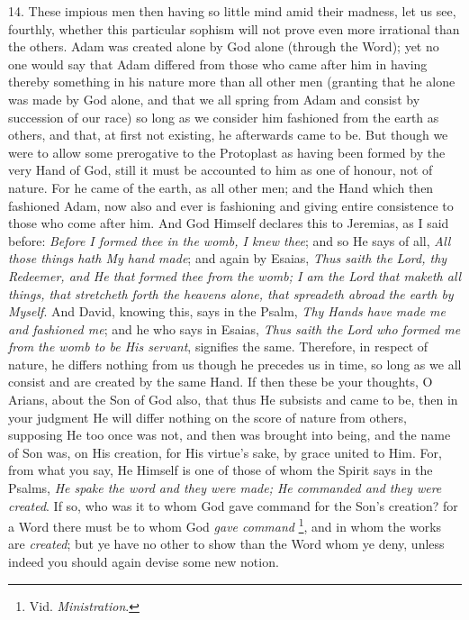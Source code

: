 14. These impious men then
having so little mind amid their madness, let us see, fourthly,
whether this particular sophism will not prove even more irrational
than the others. Adam was created alone by God alone (through the
Word); yet no one would say that Adam differed from those who came
after him in having thereby something in his nature more than all
other men (granting that he alone was made by God alone, and that we
all spring from Adam and consist by succession of our race) so long as
we consider him fashioned from the earth as others, and that, at first
not existing, he afterwards came to be. But though we were to allow
some prerogative to the Protoplast as having been formed by the very
Hand of God, still it must be accounted to him as one of honour, not
of nature. For he came of the earth, as all other men; and the Hand
which then fashioned Adam, now also and ever is fashioning and giving
entire consistence to those who come after him. And God Himself
declares this to Jeremias, as I said before: \emph{Before I formed thee
in the womb, I knew thee}; and so He says of all, \emph{All those
things hath My hand made}; and again by Esaias, \emph{Thus saith the
Lord, thy Redeemer, and He that formed thee from the womb; I am the
Lord that maketh all things, that stretcheth forth the heavens alone,
that spreadeth abroad the earth by Myself}. And David, knowing
this, says in the Psalm, \emph{Thy Hands have made me and fashioned me};
and he who says in Esaias, \emph{Thus saith the Lord who formed me from
the womb to be His servant}, signifies the same. Therefore, in
respect of nature, he differs nothing from us though he precedes us in
time, so long as we all consist and are created by the same Hand. If
then these be your thoughts, O Arians, about the Son of God also, that
thus He subsists and came to be, then in your judgment He will
differ nothing on the score of nature from others, supposing He too
once was not, and then was brought into being, and the name of Son
was, on His creation, for His virtue's sake, by grace united to Him.
For, from what you say, He Himself is one of those of whom the Spirit
says in the Psalms, \emph{He spake the word and they were made; He
commanded and they were created}. If so, who was it to whom God
gave command for the Son's creation? for a Word there must be to whom
God \emph{gave command} \footnote{Vid. \emph{Ministration}.},
and in whom the works are \emph{created}; but ye have no other to show
than the Word whom ye deny, unless indeed you should again devise some
new notion.

